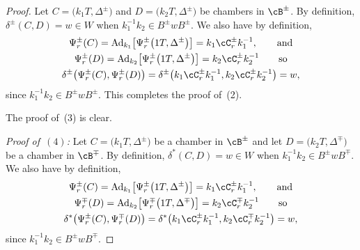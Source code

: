 \begin{proof}
Let $C = \big(k_1T,\Delta^\pm\big)$ and $D = \big(k_2T,\Delta^\pm\big)$ be chambers in $\cB^\pm$. By definition, $\delta^\pm(C,D) = w\in W$ when $k_1^{-1} k_2\in B^\pm w B^\pm$.
We also have by definition,
\begin{gather*}
\Psi_r^\pm(C) = {\rm Ad}_{k_1}\big[\Psi_r^\pm\big(1T,\Delta^\pm\big)\big] = k_1 \cC_r^\pm k_1^{-1}, \qquad\hbox{and}\\
 \Psi_r^\pm(D) = {\rm Ad}_{k_2}\big[\Psi_r^\pm\big(1T,\Delta^\pm\big)\big] = k_2 \cC_r^\pm k_2^{-1} \qquad\hbox{so}\\
 \delta^\pm\big(\Psi_r^\pm(C),\Psi_r^\pm(D)\big) = \delta^\pm\big(k_1 \cC_r^\pm k_1^{-1}, k_2 \cC_r^\pm k_2^{-1}\big) = w,
\end{gather*}
since $k_1^{-1} k_2\in B^\pm w B^\pm$. This completes the proof of~(2).

The proof of~(3) is clear.

{\it Proof of~$(4)$:}
Let $C = \big(k_1T,\Delta^\pm\big)$ be a chamber in $\cB^\pm$ and let $D = \big(k_2T,\Delta^\mp\big)$ be a chamber in $\cB^\mp$. By definition,
$\delta^*(C,D) = w\in W$ when $k_1^{-1} k_2\in B^\pm w B^\mp$.
We also have by definition,
\begin{gather*}
\Psi_r^\pm(C) = {\rm Ad}_{k_1}\big[\Psi_r^\pm\big(1T,\Delta^\pm\big)\big] = k_1 \cC_r^\pm k_1^{-1}, \qquad\hbox{and}\\
\Psi_r^\mp(D) = {\rm Ad}_{k_2}\big[\Psi_r^\mp\big(1T,\Delta^\mp\big)\big] = k_2 \cC_r^\mp k_2^{-1} \qquad\hbox{so}\\
\delta^*\big(\Psi_r^\pm(C),\Psi_r^\mp(D)\big) = \delta^*\big(k_1 \cC_r^\pm k_1^{-1}, k_2 \cC_r^\mp k_2^{-1}\big) = w,
\end{gather*}
since $k_1^{-1} k_2\in B^\pm w B^\mp$.
\end{proof}

